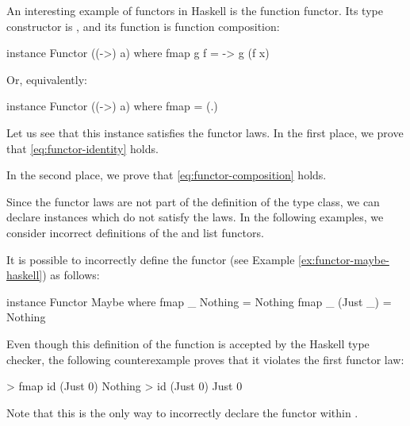 \begin{example}
  \label{ex:functor-function-haskell}


  An interesting example of functors in Haskell is the function
  functor. Its type constructor is , and its
   function is function composition:
  \begin{codehaskell}
instance Functor ((->) a) where
  fmap g f = \x -> g (f x)
  \end{codehaskell}
  Or, equivalently:
  \begin{codehaskell}
instance Functor ((->) a) where
  fmap = (.)
  \end{codehaskell}
  Let us see that this instance satisfies the functor laws. In the
  first place, we prove that \eqref{eq:functor-identity} holds.
  \begin{steps}
      \eqby{\eqref{eq:category-identity}}
  \end{steps}
  In the second place, we prove that \eqref{eq:functor-composition}
  holds.
  \begin{steps}
      \eqby{\eqref{eq:category-associativity}}
  \end{steps}

\end{example}

Since the functor laws are not part of the definition of the
 type class, we can declare instances which do
not satisfy the laws. In the following examples, we consider incorrect
definitions of the  and list functors.

\begin{example}
  \label{ex:functor-bad-maybe-haskell}

  It is possible to incorrectly define the  functor
  (see Example \ref{ex:functor-maybe-haskell}) as follows:
  \begin{codehaskell}
instance Functor Maybe where
  fmap _ Nothing  = Nothing
  fmap _ (Just _) = Nothing
  \end{codehaskell}
  Even though this definition of the  function is
  accepted by the Haskell type checker, the following counterexample
  proves that it violates the first functor law:
  \begin{codehaskell}
> fmap id (Just 0)
Nothing
> id (Just 0)
Just 0
  \end{codehaskell}
  Note that this is the only way to incorrectly declare the
   functor within \hask.

\end{example}

